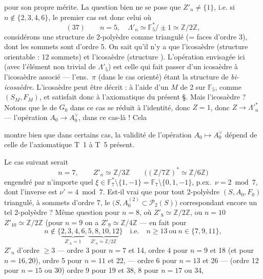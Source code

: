 \documentclass[11pt,a4paper]{article}
\begin{document}
pour son propre mérite. La question bien  ne se pose que  $Z'_n \neq \{1\}$, i.e. si $n \notin \{2,3,4,6\}$, le premier cas est donc celui où
\[
(37) \qquad n = 5, \quad \Lambda'_n \simeq \mathbb{F}_5^{*}/\pm 1 \simeq \mathbb{Z}/2\mathbb{Z},
\]
considérons une structure de 2-polyèdre comme triangulé (= faces d'ordre 3), dont les sommets sont d'ordre 5. On sait qu'il n'y a que l'icosaèdre (structure orientable : 12 sommets) et l'icosaèdre  (structure ). L'opération envisagée ici (avec l'élément non trivial de $\Lambda'_5$) est celle qui fait passer d'un icosaèdre à l'icosaèdre associé — l'ens.\ $\pi$ (dans le cas orienté) étant la structure de \emph{bi-icosaèdre}. L'icosaèdre peut être décrit : à l'aide d'un  $M$ de  2 sur $\mathbb{F}_5$, comme $(S_M, F_M)$, et satisfait donc à l'axiomatique du présent §. Mais l'icosaèdre  ? Notons que le  de $G_0$ dans ce cas se réduit à l'identité, donc $Z = 1$, donc $Z \to \Lambda'^{*}_n$ \ill{}  — \ill{} \struck{\ill{}} \ill{} l'opération $A_0 \to A_0^{\vee}$, dans ce cas-là ! Cela

montre bien que dans certains cas, la validité de l'opération $A_0 \mapsto A_0^{\vee}$ dépend de celle de l'axiomatique T~1 à T~5  \ill{} présent.

Le cas suivant serait \struck{\ill{}}
\[
n = 7, \qquad Z'_n \simeq \mathbb{Z}/3\mathbb{Z} \qquad \bigl((\mathbb{Z}/7\mathbb{Z})^{*} \simeq \mathbb{Z}/6\mathbb{Z}\bigr)
\]
engendré par n'importe quel $\xi \in \mathbb{F}_7^{*} \setminus \{1,-1\} = \mathbb{F}_7 \setminus \{0,1,-1\}$, p.ex.\ $\nu = 2 \bmod 7$, dont l'inverse est $\nu' = 4 \bmod 7$. Est-il vrai que pour tout 2-polyèdre $(S, A_0, F_0)$ \struck{\ill{}} triangulé, à sommets d'ordre 7, le  $\bigl(S, A_0^{(2)} \subset \mathcal{P}_2(S)\bigr)$ correspondant  encore un tel 2-polyèdre ? Même question pour $n = 8$, où $Z'_8 \simeq \mathbb{Z}/2\mathbb{Z}$, ou $n = 10$  $Z'_{10} \simeq \mathbb{Z}/2\mathbb{Z}$ (pour $n = 9$ on a $Z'_9 \simeq \mathbb{Z}/4\mathbb{Z}$ — en fait pour
\[
n \notin \{\underbrace{2,3,4,6}_{Z'_n = 1}, \underbrace{5,8,10,12}_{Z'_n \simeq \mathbb{Z}/2\mathbb{Z}}\} \quad \text{i.e.} \quad n \geqslant 13 \ \text{ou}\ n \in \{7, 9, 11\},
\]
$Z'_n$ d'ordre $\geqslant 3$ — ordre 3 pour $n = 7$ et 14, ordre 4 pour $n = 9$ et 18 (et pour $n = 16, 20$), ordre 5 pour $n = 11$ et 22, — ordre 6 pour $n = 13$ et 26 — (ordre 12 pour $n = 15$ ou 30) \struck{\ill{}} ordre 9 pour \struck{\ill{}} 19 et 38, 8 pour $n = 17$ ou 34,
\end{document}
